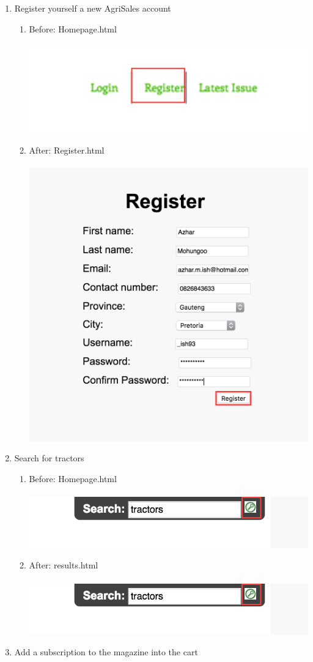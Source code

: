 \documentclass[11pt]{article}
\begin{document}
\begin{enumerate}
\begin{enumerate}
			\end{enumerate} \newpage
		\item Register yourself a new AgriSales account
			\begin{enumerate}
				\item Before: Homepage.html \\ \\
					\includegraphics[width=0.7\linewidth]{../Images/Tasks/Task3Before}
				\item After: Register.html \\ \\
					\includegraphics[width=0.5\linewidth]{../Images/Tasks/Task3After}
			\end{enumerate}
		\item Search for tractors
			\begin{enumerate}
				\item Before: Homepage.html \\ \\
					\includegraphics[width=0.8\linewidth]{../Images/Tasks/Task4Before}
				\item After: results.html \\ \\
					\includegraphics[width=0.5\linewidth]{../Images/Tasks/Task4Before}
			\end{enumerate}
		\item Add a subscription to the magazine into the cart

\end{enumerate}
\end{document}
